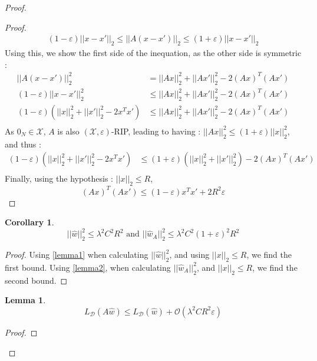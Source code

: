 \documentclass{article}
\newtheorem{corollary}{Corollary}[theorem]
\newtheorem{lemma}[theorem]{Lemma}
\begin{document}
\begin{proof}
\begin{proof}
        \begin{align*}
            (1-\varepsilon) ||x-x'||_2 
            \leq ||A(x-x')||_2
            \leq (1+\varepsilon) ||x-x'||_2 
        \end{align*}
        Using this, we show the first side of the inequation, 
        as the other side is symmetric :
        \begin{align*}
            ||A(x-x')||_2^2 &= ||Ax||^2_2  + ||Ax'||^2_2 - 2 (Ax)^T(Ax') \\
            (1-\varepsilon) ||x-x'||^2_2 &\leq ||Ax||^2_2  + ||Ax'||^2_2 - 2 (Ax)^T(Ax') \\
            (1-\varepsilon) (||x||^2_2+||x'||^2_2 -2x^T x') 
            &\leq ||Ax||^2_2  + ||Ax'||^2_2 - 2 (Ax)^T(Ax') \\
        \end{align*}
        As $0_N \in \mathcal{X}$, $A$ is also $(\mathcal{X},
         \varepsilon)$-RIP, leading to having :
        $||Ax||^2_2 \leq (1+\varepsilon)||x||^2_2$, and thus :
        \begin{align*}
            (1-\varepsilon) (||x||^2_2+||x'||^2_2 -2x^T x') 
            &\leq (1+\varepsilon)(||x||^2_2  + ||x'||^2_2) - 2 (Ax)^T(Ax') \\
        \end{align*}
        Finally, using the hypothesis : $||x||_2 \leq R$, 
        \[  (Ax)^T(Ax') \leq (1-\varepsilon)x^Tx' + 2R^2\varepsilon \]
    \end{proof}
    \begin{corollary}
        \[
            ||\hat{w}||_2^2 
            \leq \lambda^2 C^2 R^2 \text{ and }
            ||\hat{w}_A||_2^2 
            \leq \lambda^2 C^2 (1+\varepsilon)^2 R^2
        \]
    \end{corollary}
    \begin{proof} \label{corollary1}
        Using \ref{lemma1} when calculating $||\hat{w}||_2^2$, and using
        $||x||_2\leq R$, we find the first bound. Using \ref{lemma2}, when 
        calculating $||\hat{w}_A||_2^2$, and $||x||_2\leq R$, we find the 
        second bound.
    \end{proof}
    \begin{lemma}\label{lemma3}
        \[ L_{\mathcal{D}} (A\hat{w}) \leq 
         L_{\mathcal{D}}(\hat{w}) + \mathcal{O}(\lambda^2 C R^2 \varepsilon)\]
    \end{lemma}
    \begin{proof}

\end{proof}
\end{proof}
\end{document}
